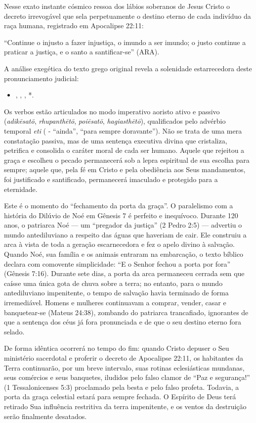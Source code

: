 \documentclass[11pt,a4paper,openany]{book}
\begin{document}
Nesse exato instante cósmico ressoa dos lábios soberanos de Jesus Cristo o decreto irrevogável que sela perpetuamente o destino eterno de cada indivíduo da raça humana, registrado em Apocalipse 22:11:

``Continue o injusto a fazer injustiça, o imundo a ser imundo; o justo continue a praticar a justiça, e o santo a santificar-se'' (ARA).

A análise exegética do texto grego original revela a solenidade estarrecedora deste pronunciamento judicial:
\begin{itemize}
  \item , , , *.
\end{itemize}


Os verbos estão articulados no modo imperativo aoristo ativo e passivo (\textit{adikēsatō}, \textit{rhupanthētō}, \textit{poiēsatō}, \textit{hagiasthētō}), qualificados pelo advérbio temporal \textit{eti} ( - ``ainda'', ``para sempre doravante''). Não se trata de uma mera constatação passiva, mas de uma sentença executiva divina que cristaliza, petrifica e consolida o caráter moral de cada ser humano. Aquele que rejeitou a graça e escolheu o pecado permanecerá sob a lepra espiritual de sua escolha para sempre; aquele que, pela fé em Cristo e pela obediência aos Seus mandamentos, foi justificado e santificado, permanecerá imaculado e protegido para a eternidade.

Este é o momento do ``fechamento da porta da graça''. O paralelismo com a história do Dilúvio de Noé em Gênesis 7 é perfeito e inequívoco. Durante 120 anos, o patriarca Noé — um ``pregador da justiça'' (2 Pedro 2:5) — advertiu o mundo antediluviano a respeito das águas que haveriam de cair. Ele construiu a arca à vista de toda a geração escarnecedora e fez o apelo divino à salvação. Quando Noé, sua família e os animais entraram na embarcação, o texto bíblico declara com comovente simplicidade: ``E o Senhor fechou a porta por fora'' (Gênesis 7:16). Durante sete dias, a porta da arca permaneceu cerrada sem que caísse uma única gota de chuva sobre a terra; no entanto, para o mundo antediluviano impenitente, o tempo de salvação havia terminado de forma irremediável. Homens e mulheres continuavam a comprar, vender, casar e banquetear-se (Mateus 24:38), zombando do patriarca trancafiado, ignorantes de que a sentença dos céus já fora pronunciada e de que o seu destino eterno fora selado.

De forma idêntica ocorrerá no tempo do fim: quando Cristo depuser o Seu ministério sacerdotal e proferir o decreto de Apocalipse 22:11, os habitantes da Terra continuarão, por um breve intervalo, suas rotinas eclesiásticas mundanas, seus comércios e seus banquetes, iludidos pelo falso clamor de ``Paz e segurança!'' (1 Tessalonicenses 5:3) proclamado pela besta e pelo falso profeta. Todavia, a porta da graça celestial estará para sempre fechada. O Espírito de Deus terá retirado Sua influência restritiva da terra impenitente, e os ventos da destruição serão finalmente desatados.
\end{document}
